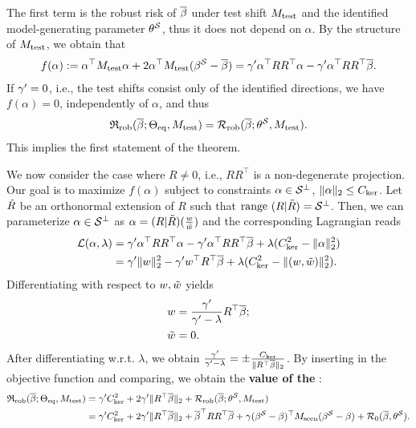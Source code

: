 The first term is the robust risk of $\overline{\beta}$ under test shift $M_{\mathrm{test}}$ and the identified model-generating parameter $\theta^{\mathcal{S}}$, thus it does not depend on $\alpha$. 
By the structure of $M_{\mathrm{test}}$, we obtain that 
\begin{align*}
    f(\alpha) := \alpha^\top M_{\mathrm{test}} \alpha + 2 \alpha^\top M_{\mathrm{test}}(\beta^{\mathcal{S}} -  \overline{\beta} )  = \gamma' \alpha^\top R R^\top \alpha - \gamma' \alpha^\top R R^\top \overline{\beta}. 
\end{align*}
If $\gamma' = 0$, i.e., the test shifts consist only of the identified directions, we have $f(\alpha) = 0$, independently of $\alpha$, and thus 
\begin{align*}
     \mathfrak{R}_{\mathrm{rob}}(\overline{\beta}; \Theta_{\mathrm{eq}}, M_{\mathrm{test}}) = \mathcal{R}_{\mathrm{rob}}(\overline{\beta}; \theta^{\mathcal{S}}, M_{\mathrm{test}}).
\end{align*}
This implies the first statement of the theorem. 
\par
We now consider the case where $R \neq 0$, i.e., $R R^\top$ is a non-degenerate projection.
Our goal is to maximize $f(\alpha)$ subject to constraints $\alpha \in \mathcal{S}^\perp$, $\| \alpha \|_2 \leq C_{\mathrm{ker}}$. Let $\tilde{R}$ be an orthonormal extension of $R$ such that $\mathrm{range}\ (R | \tilde{R}) = \mathcal{S}^\perp$. Then, we can parameterize $\alpha \in \mathcal{S}^\perp$ as $\alpha = (R | \tilde{R}) (\frac{w} {\tilde{w}})$ and the corresponding Lagrangian reads
\begin{align*}
    \mathcal{L}(\alpha, \lambda) &= \gamma' \alpha^\top R R^\top \alpha - \gamma' \alpha^\top R R^\top \overline{\beta} + \lambda(C_{\mathrm{ker}}^2 - \| \alpha \|_2^2) \\ &= \gamma' \| w \|_2^2 -\gamma' w^\top R^\top \overline{\beta} + \lambda(C_{\mathrm{ker}}^2 - \| (w, \tilde{w}) \|_2^2). 
\end{align*}
Differentiating with respect to $w, \tilde{w}$ yields
\begin{align*}
    w &= \frac{\gamma'}{\gamma' - \lambda} R^\top \overline{\beta}; \\
    \tilde{w} &= 0. 
\end{align*}
After differentiating w.r.t. $\lambda$, we obtain
$\frac{\gamma'}{\gamma' - \lambda} = \pm \frac{C_{\mathrm{ker}}}{\| R^\top \overline{\beta} \|_2}$. By inserting in the objective function and comparing, we obtain the \textbf{value of the \idRR}: 
\begin{align}\label{eqn:proofs-id-robust-risk}
    \mathfrak{R}_{\mathrm{rob}}(\overline{\beta}; \Theta_{\mathrm{eq}}, M_{\mathrm{test}}) &= \gamma' C_{\mathrm{ker}}^2 + 2 \gamma' \| R^\top \overline{\beta} \|_2 + \mathcal{R}_{\mathrm{rob}}(\overline{\beta}; \theta^{\mathcal{S}}, M_{\mathrm{test}}) \\
    &= \gamma' C_{\mathrm{ker}}^2 + 2 \gamma' \| R^\top \overline{\beta} \|_2 + \overline{\beta}^\top R R^\top \overline{\beta} + \gamma (\beta^{\mathcal{S}} - \beta)^\top M_{\mathrm{seen}} (\beta^{\mathcal{S}} - \beta) + \mathcal{R}_0 (\overline{\beta},\theta^{\mathcal{S}}).
\end{align}
